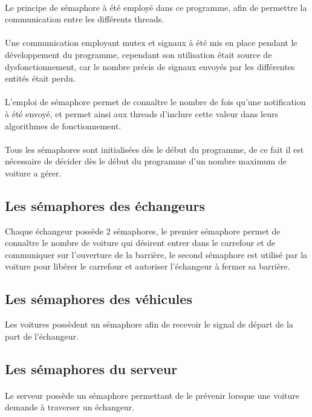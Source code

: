 \documentclass{report}
\begin{document}
	\paragraph{}
	Le principe de sémaphore à été employé dans ce programme, afin de permettre la communication entre les différents threads. 
	\paragraph{}
	Une communication employant mutex et signaux à été mis en place pendant le développement du programme, cependant son utilisation était source de dysfonctionnement, car le nombre précis de signaux envoyés par les différentes entités était perdu.
	\paragraph{}
	L'emploi de sémaphore permet de connaître le nombre de fois qu'une notification à été envoyé, et permet ainsi aux threads d'inclure cette valeur dans leurs algorithmes de fonctionnement.
	\paragraph{}
	Tous les sémaphores sont initialisées dès le début du programme, de ce fait il est nécessaire de décider dès le début du programme d'un nombre maximum de voiture a gérer.
	
			\subsection{Les sémaphores des échangeurs}
			Chaque échangeur possède 2 sémaphores, le premier sémaphore permet de connaître le nombre de voiture qui désirent entrer dans le carrefour et de communiquer sur l'ouverture de la barrière, le second sémaphore est utilisé par la voiture pour libérer le carrefour et autoriser l'échangeur à fermer sa barrière.

			\subsection{Les sémaphores des véhicules}
			Les voitures possèdent un sémaphore afin de recevoir le signal de départ de la part de l’échangeur. 

			\subsection{Les sémaphores du serveur}
			\paragraph{}
			Le serveur possède un sémaphore permettant de le prévenir lorsque une voiture demande à traverser un échangeur.
		
		
	
\end{document}
